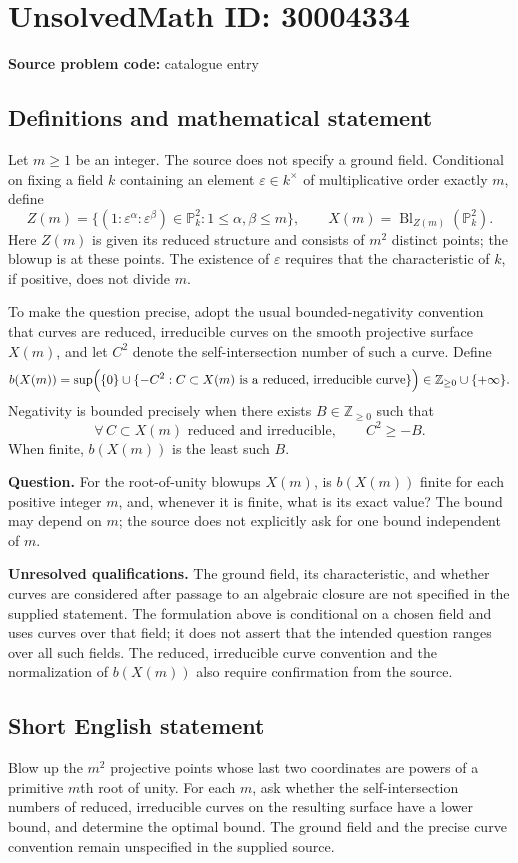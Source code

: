\documentclass[11pt]{article}
\newcommand{\Z}{\mathbb{Z}}
\newcommand{\PP}{\mathbb{P}}
\begin{document}
\section*{UnsolvedMath ID: 30004334}
\textbf{Source problem code:} catalogue entry
\subsection{Definitions and mathematical statement}
Let \(m\geq 1\) be an integer. The source does not specify a ground field. Conditional on fixing a field \(k\) containing an element \(\varepsilon\in k^{\times}\) of multiplicative order exactly \(m\), define
\[
Z(m)=\bigl\{(1:\varepsilon^{\alpha}:\varepsilon^{\beta})\in\PP^{2}_{k}:1\leq\alpha,\beta\leq m\bigr\},
\qquad
X(m)=\operatorname{Bl}_{Z(m)}(\PP^{2}_{k}).
\]
Here \(Z(m)\) is given its reduced structure and consists of \(m^{2}\) distinct points; the blowup is at these points. The existence of \(\varepsilon\) requires that the characteristic of \(k\), if positive, does not divide \(m\).

To make the question precise, adopt the usual bounded-negativity convention that curves are reduced, irreducible curves on the smooth projective surface \(X(m)\), and let \(C^{2}\) denote the self-intersection number of such a curve. Define
\[
b(X(m))=\sup\Bigl(\{0\}\cup\{-C^{2}:C\subset X(m)\text{ is a reduced, irreducible curve}\}\Bigr)
\in\Z_{\geq0}\cup\{+\infty\}.
\]
Negativity is bounded precisely when there exists \(B\in\Z_{\geq0}\) such that
\[
\forall\, C\subset X(m)\text{ reduced and irreducible},\qquad C^{2}\geq-B.
\]
When finite, \(b(X(m))\) is the least such \(B\).

\textbf{Question.} For the root-of-unity blowups \(X(m)\), is \(b(X(m))\) finite for each positive integer \(m\), and, whenever it is finite, what is its exact value? The bound may depend on \(m\); the source does not explicitly ask for one bound independent of \(m\).

\textbf{Unresolved qualifications.} The ground field, its characteristic, and whether curves are considered after passage to an algebraic closure are not specified in the supplied statement. The formulation above is conditional on a chosen field and uses curves over that field; it does not assert that the intended question ranges over all such fields. The reduced, irreducible curve convention and the normalization of \(b(X(m))\) also require confirmation from the source.
\subsection{Short English statement}
Blow up the \(m^{2}\) projective points whose last two coordinates are powers of a primitive \(m\)th root of unity. For each \(m\), ask whether the self-intersection numbers of reduced, irreducible curves on the resulting surface have a lower bound, and determine the optimal bound. The ground field and the precise curve convention remain unspecified in the supplied source.
\end{document}
